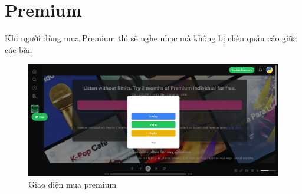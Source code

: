 \section{Premium}
Khi người dùng mua Premium thì sẽ nghe nhạc mà không bị chèn quản cáo giữa các bài.
\begin{figure}[H]
    \centering
    \includegraphics[width=1\textwidth]{imgs/chap5/premium_1.png}
    \caption{Giao diện mua premium}
\end{figure}

